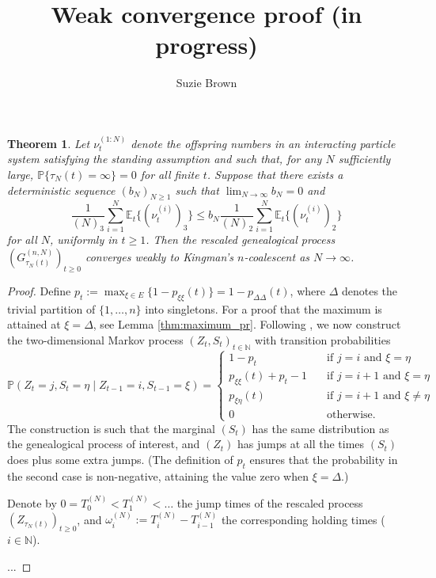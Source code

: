 \documentclass{article}
\title{Weak convergence proof (in progress)}
\author{Suzie Brown}
\newtheorem{theorem}{Theorem}
\newcommand{\Prob}{\mathbb{P}}
\newcommand{\Et}{\mathbb{E}_t}
\newcommand{\1}[1]{\mathbb{I}_{#1}}
\begin{document}
\maketitle
\thispagestyle{fancy}

\begin{theorem}\label{thm:weakconv}
Let $\nu_t^{(1:N)}$ denote the offspring numbers in an interacting particle system satisfying the standing assumption and such that, for any $N$ sufficiently large, $\Prob\{ \tau_N(t) = \infty \} =0$ for all finite $t$. Suppose that there exists a deterministic sequence $(b_N)_{N\geq1}$ such that ${\lim}_{N\to\infty} b_N =0$ and
\begin{equation}\label{eq:mainthmcond}
\frac{1}{(N)_3} \sum_{i = 1}^N \Et\{ (\nu_t^{(i)})_3 \}  \leq b_N \frac{1}{(N)_2} \sum_{i = 1}^N \Et\{ (\nu_t^{(i)})_2 \}
\end{equation}
for all $N$, uniformly in $t \geq 1$.
Then the rescaled genealogical process $(G_{\tau_N(t)}^{(n,N)})_{t\geq0}$ converges weakly to Kingman's $n$-coalescent as $N \to \infty$.
\end{theorem}

\begin{proof}
Define $p_t := \max_{\xi\in E} \{1 - p_{\xi\xi}(t)\} = 1 - p_{\Delta\Delta}(t)$, where $\Delta$ denotes the trivial partition of $\{1,\dots,n\}$ into singletons. For a proof that the maximum is attained at $\xi = \Delta$, see Lemma \ref{thm:maximum_pr}. 
Following \citet{mohle1999}, we now construct the two-dimensional Markov process $(Z_t, S_t)_{t \in \mathbb{N}}$ with transition probabilities
\begin{equation}
\Prob(Z_t = j , S_t = \eta \mid Z_{t-1} = i, S_{t-1} = \xi)
= \begin{cases}
1 - p_t &\quad \text{if } j=i \text{ and } \xi=\eta \\
p_{\xi\xi}(t) + p_t - 1  &\quad \text{if } j=i+1 \text{ and } \xi=\eta \\
p_{\xi\eta}(t) &\quad \text{if } j=i+1 \text{ and } \xi\neq\eta \\
0 &\quad \text{otherwise} .
\end{cases}
\end{equation}
The construction is such that the marginal $(S_t)$ has the same distribution as the genealogical process of interest, and $(Z_t)$ has jumps at all the times $(S_t)$ does plus some extra jumps. (The definition of $p_t$ ensures that the probability in the second case is non-negative, attaining the value zero when $\xi=\Delta$.)

Denote by $0=T_0^{(N)}<T_1^{(N)}<\dots$ the jump times of the rescaled process $(Z_{\tau_N(t)})_{t\geq0}$, and $\omega_i^{(N)} := T_i^{(N)} - T_{i-1}^{(N)}$ the corresponding holding times ($i\in\mathbb{N}$).

...
\end{proof}
\end{document}
